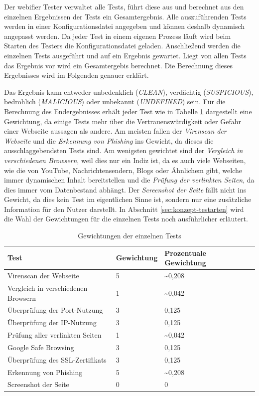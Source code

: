 Der webifier Tester verwaltet alle Tests, führt diese aus und berechnet aus den einzelnen Ergebnissen der Tests ein Gesamtergebnis. Alle auszuführenden Tests werden in einer Konfigurationsdatei angegeben und können deshalb dynamisch angepasst werden. Da jeder Test in einem eigenen Prozess läuft wird beim Starten des Testers die Konfigurationsdatei geladen. Anschließend werden die einzelnen Tests ausgeführt und auf ein Ergebnis gewartet. Liegt von allen Tests das Ergebnis vor wird ein Gesamtergebis berechnet. Die Berechnung dieses Ergebnisses wird im Folgenden genauer erklärt.

Das Ergebnis kann entweder unbedenklich (\textit{CLEAN}), verdächtig (\textit{SUSPICIOUS}), bedrohlich (\textit{MALICIOUS}) oder unbekannt (\textit{UNDEFINED}) sein. Für die Berechnung des Endergebnisses erhält jeder Test wie in Tabelle \ref{tbl:test-weights} dargestellt eine Gewichtung, da einige Tests mehr über die Vertrauenswürdigkeit oder Gefahr einer Webseite aussagen als andere. Am meisten fallen der \textit{Virenscan der Webseite} und die \textit{Erkennung von Phishing} ins Gewicht, da dieses die ausschlaggebendsten Tests sind. Am wenigsten gewichtet sind der \textit{Vergleich in verschiedenen Browsern}, weil dies nur ein Indiz ist, da es auch viele Webseiten, wie die von YouTube, Nachrichtensendern, Blogs oder Ähnlichem gibt, welche immer dynamischen Inhalt bereitstellen und die \textit{Prüfung der verlinkten Seiten}, da dies immer vom Datenbestand abhängt. Der \textit{Screenshot der Seite} fällt nicht ins Gewicht, da dies kein Test im eigentlichen Sinne ist, sondern nur eine zusätzliche Information für den Nutzer darstellt. In Abschnitt \ref{sec:konzept-testarten} wird die Wahl der Gewichtungen für die einzelnen Tests noch ausführlicher erläutert.

\begin{table}[H]
\centering
\begin{tabular}{|l|l|l|l|}
\hline
\textbf{Test} & \textbf{Gewichtung} & \textbf{Prozentuale Gewichtung} \\\hline
Virenscan der Webseite & 5 & \textasciitilde0,208\\\hline
Vergleich in verschiedenen Browsern & 1 & \textasciitilde0,042\\\hline
Überprüfung der Port-Nutzung & 3 & 0,125\\\hline
Überprüfung der IP-Nutzung & 3 & 0,125\\\hline
Prüfung aller verlinkten Seiten & 1 & \textasciitilde0,042\\\hline
Google Safe Browsing & 3 & 0,125\\\hline
Überprüfung des SSL-Zertifikats & 3 & 0,125\\\hline
Erkennung von Phishing & 5 & \textasciitilde0,208\\\hline
Screenshot der Seite & 0 & 0\\\hline
\end{tabular}
\caption{Gewichtungen der einzelnen Tests}
\label{tbl:test-weights}
\end{table}

